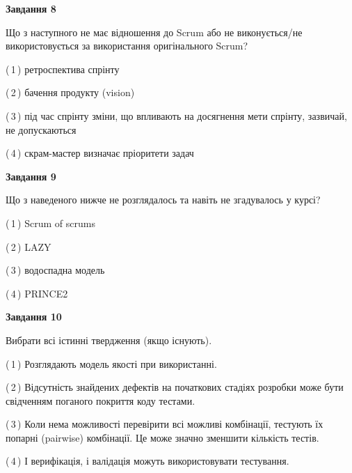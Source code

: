 \documentclass[10pt, ukrainian]{article}
\begin{document}
{\begin {large}
{\begin {center}\textbf{Завдання 8}\end {center}}\par
Що з наступного не має відношення до Scrum або не виконується/не використовується за використання оригінального Scrum?\par
\vspace{2mm}



(\,1\,) ретроспектива спрінту%



(\,2\,) бачення продукту (vision) %



(\,3\,) під час спрінту зміни, що впливають на досягнення мети спрінту, зазвичай, не допускаються%



(\,4\,) скрам-мастер визначає пріоритети задач%


{\begin {center}\textbf{Завдання 9}\end {center}}\par
Що з наведеного нижче не розглядалось та навіть не згадувалось у курсі?\par
\vspace{2mm}



(\,1\,) Scrum of scrums%



(\,2\,) LAZY%



(\,3\,) водоспадна модель%



(\,4\,) PRINCE2%


{\begin {center}\textbf{Завдання 10}\end {center}}\par
Вибрати всі істинні твердження (якщо існують).\par
\vspace{2mm}



(\,1\,) Розглядають модель якості при використанні.%



(\,2\,) Відсутність знайдених дефектів на початкових стадіях розробки може бути свідченням поганого покриття коду тестами.%



(\,3\,) Коли нема можливості перевірити всі можливі комбінації, тестують їх попарні (pairwise) комбінації. Це може значно зменшити кількість тестів.%



(\,4\,) І верифікація, і валідація можуть використовувати тестування.%



\end {large}}
\end{document}
